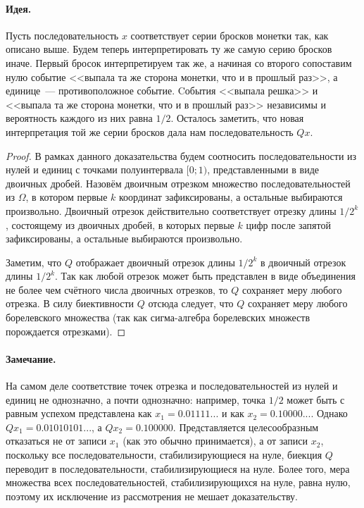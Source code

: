 \paragraph{Идея.}
	Пусть последовательность $x$ соответствует серии бросков монетки так, как описано выше.
	Будем теперь интерпретировать ту же самую серию бросков иначе.
	Первый бросок интерпретируем так же,
	а начиная со второго сопоставим нулю событие <<выпала та же сторона монетки, что и в прошлый раз>>,
	а единице~--- противоположное событие.
	Cобытия <<выпала решка>> и <<выпала та же сторона монетки, что и в прошлый раз>> независимы
	и вероятность каждого из них равна $1/2$.
	Осталось заметить, что новая интерпретация той же серии бросков дала нам последовательность $Qx$.
\begin{proof}
	В рамках данного доказательства будем соотносить последовательности из нулей и единиц
	с точками полуинтервала $[0;1)$, представленными в виде двоичных дробей.
	Назовём двоичным отрезком множество последовательностей из $\Omega$,
	в котором первые $k$ координат зафиксированы, а остальные выбираются произвольно.
	Двоичный отрезок действительно соответствует отрезку длины $1/2^k$,
	состоящему из двоичных дробей, в которых первые $k$ цифр после запятой зафиксированы,
	а остальные выбираются произвольно.

	Заметим, что $Q$ отображает двоичный отрезок длины $1/2^k$ в двоичный отрезок длины $1/2^k$.
	Так как любой отрезок может быть представлен в виде объединения не более чем счётного числа
	двоичных отрезков, то $Q$ сохраняет меру любого отрезка.
	В силу биективности $Q$ отсюда следует, что $Q$ сохраняет меру любого борелевского множества
	(так как сигма-алгебра борелевских множеств порождается отрезками).
\end{proof}

\paragraph{Замечание.}
На самом деле соответствие точек отрезка и последовательностей из нулей и единиц не однозначно,
а почти однозначно: например, точка $1/2$ может быть с равным успехом
представлена как $x_1=0.01111...$ и как $x_2=0.10000...$.
Однако $Qx_1 = 0.01010101...$, а $Qx_2=0.100000$.
Представляется целесообразным отказаться не от записи $x_1$ (как это обычно принимается),
а от записи $x_2$, поскольку все последовательности, стабилизирующиеся на нуле,
биекция $Q$ переводит в последовательности, стабилизирующиеся на нуле.
Более того, мера множества всех последовательностей, стабилизирующихся на нуле, равна нулю,
поэтому их исключение из рассмотрения не мешает доказательству.

